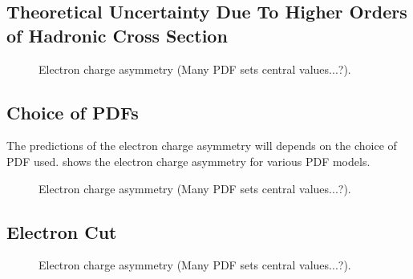 

\subsection{Theoretical Uncertainty Due To Higher Orders of Hadronic Cross Section}

\begin{figure}[htbp]
  \centering
  \caption{Electron charge asymmetry (Many PDF sets central values...?).}
  \label{fig:asym_order}
\end{figure}


\subsection{Choice of \acp{PDF}}

The predictions of the electron charge asymmetry will depends on the choice of
\ac{PDF} used. 
 shows the electron charge asymmetry for
various \ac{PDF} models.

\begin{figure}[htbp]
  \centering
  \caption{Electron charge asymmetry (Many PDF sets central values...?).}
  \label{wbos:asym_pdf}
\end{figure}



\subsection{Electron \pT Cut}
\begin{figure}[htbp]
  \centering
  \caption{Electron charge asymmetry (Many PDF sets central values...?).}
  \label{fig:asymptcuts}
\end{figure}




